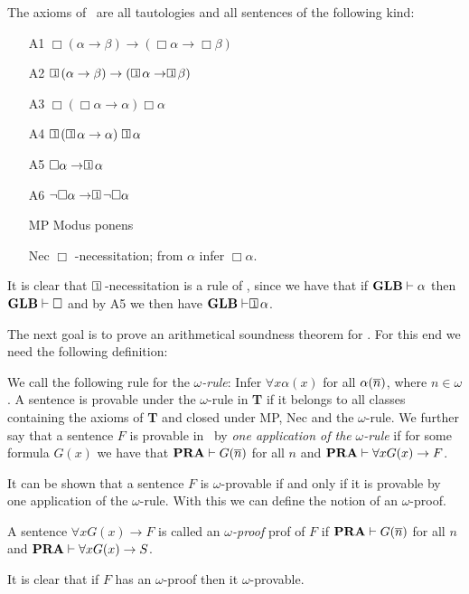 \documentclass[../main.tex]{subfiles}
\begin{document}
\begin{defi}
	The axioms of \GLB\ are all tautologies and all sentences of the
	following kind:
	\begin{enumerate}
		\item[A1]
			$\Box(\alpha\rightarrow\beta)\rightarrow(\Box\alpha\rightarrow\Box\beta)$
		\item[A2]
			$\OneBox(\alpha\rightarrow\beta)\rightarrow(\OneBox\alpha\rightarrow\OneBox\beta)$
		\item[A3] $\Box(\Box\alpha\rightarrow\alpha)\Box\alpha$
		\item[A4] $\OneBox(\OneBox\alpha\rightarrow\alpha)\OneBox\alpha$
		\item[A5] $\Box\alpha\rightarrow\OneBox\alpha$
		\item[A6] $\neg\Box\alpha\rightarrow\OneBox\neg\Box\alpha$
		\item[MP] Modus ponens
		\item[Nec] $\Box$  -necessitation; from $\alpha$ infer
			$\Box\alpha$.
	\end{enumerate}
\end{defi}
It is clear that $\OneBox$ -necessitation is a rule of \GLB, since we have that
if $\text{\textbf{GLB}}\vdash\alpha$ then $\text{\textbf{GLB}}\vdash\Box$ and by A5 we then have
$\GLB\vdash\OneBox\alpha$.

The next goal is to prove an arithmetical soundness theorem for \GLB. For this
end we need the following definition:

\begin{defi}
	We call the following rule for the  $\omega$\textit{-rule}: Infer $\forall
	x\alpha(x)$ for all $\alpha(\overline n)$, where $n\in\omega$. A sentence is
	provable under the $\omega$-rule in \textbf{T} if it belongs to all
	classes containing the axioms of \textbf{T} and closed under MP, Nec and
	the $\omega$-rule.
	We further say that a sentence $F$ is provable in \PRA\ by \textit{one
	application of the} $\omega$\textit{-rule} if for some formula $G(x)$
	we have that $\text{\textbf{PRA}}\vdash G(\overline n)$ for all $n$ and $\text{\textbf{PRA}}\vdash \forall
	x G(x)\rightarrow F$.
\end{defi}
It can be shown that  a sentence $F$ is $\omega$-provable if and only if it is provable
by one application of the $\omega$-rule. With this we can define the notion of
an $\omega$-proof.

\begin{defi}
	A sentence $\forall x G(x)\rightarrow F$ is called an
	$\omega$\textit{-proof} prof of $F$ if $\text{\textbf{PRA}}\vdash G(\overline n)$ for all
	$n$ and $\text{\textbf{PRA}}\vdash\forall x G(x)\rightarrow S$.
\end{defi}
It is clear that if $F$ has an $\omega$-proof then it $\omega$-provable.
\end{document}
